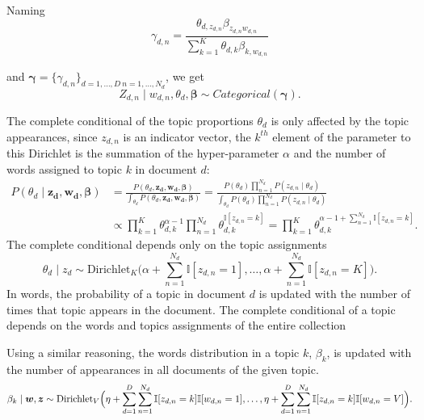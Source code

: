 Naming 
\[
  \gamma_{d,n} = \frac{\theta_{d,z_{d,n}}\beta_{z_{d,n}w_{d,n}}}{\sum_{k=1}^K \theta_{d,k}\beta_{k,w_{d,n}}}
\] 

and \(\bm{\gamma} = \{\gamma_{d,n}\}_{d=1,\dots,D \ n=1,\dots,N_{d}}\), we get
\[
  Z_{d,n} \mid w_{d,n}, \theta_{d}, \bm{\beta} \sim Categorical(\bm{\gamma}).
\]

The complete conditional of the topic proportions \(\theta_{d}\) is only affected by the topic appearances, since \(z_{d,n}\) is an indicator vector, the \(k^{th}\) element of the parameter to this Dirichlet is the summation of the hyper-parameter \(\alpha\) and the number of words assigned to topic \(k\) in document \(d\):
\[
  \begin{aligned}
    P(\theta_{d} \mid \bm{z_{d}},\bm{w_{d}}, \bm{\beta}) &= \frac{P(\theta_{d}, \bm{z_{d}}, \bm{w_{d}}, \bm{\beta})}{\int_{\theta_{d}} P(\theta_{d}, \bm{z_{d}}, \bm{w_{d}}, \bm{\beta})} = \frac{ P(\theta_{d})\prod_{n=1}^{N_{d}}P(z_{d,n}\mid \theta_{d}) }{ \int_{\theta_{d}}  P(\theta_{d})\prod_{n=1}^{N_{d}}P(z_{d,n}\mid \theta_{d})  }\\
    &\propto \prod_{k=1}^{K}\theta_{d,k}^{\alpha-1} \prod_{n=1}^{N_{d}}\theta_{d,k}^{\mathbb{I}[z_{d,n}=k]} = \prod_{k=1}^{K}\theta_{d,k}^{\alpha -1 + \sum_{n=1}^{N_{d}} \mathbb{I}[z_{d,n}=k] }.
  \end{aligned}
\]
The complete conditional depends only on the topic assignments
\[
  \theta_{d} \mid z_{d} \sim \text{Dirichlet}_{K}\Big(\alpha + \sum_{n=1}^{N_{d}} \mathbb{I}[z_{d,n}=1],\dots, \alpha + \sum_{n=1}^{N_{d}} \mathbb{I}[z_{d,n}=K]\Big).
\]
In words, the probability of a topic in document \(d\) is updated with the number of times that topic appears in the document. The complete conditional of a topic depends on the words and topics assignments of the entire collection

Using a similar reasoning, the words distribution in a topic \(k\), \(\beta_{k}\), is updated with the number of appearances in all documents of the given topic.
\[
  \beta_{k} \mid \bm{w}, \bm{z} \sim \text{Dirichlet}_{V}\Big(\eta + \sum_{d=1}^{D}\sum_{n=1}^{N_{d}}\mathbb{I}[z_{d,n} = k]\mathbb{I}[w_{d,n} = 1], \dots, \eta + \sum_{d=1}^{D}\sum_{n=1}^{N_{d}}\mathbb{I}[z_{d,n} = k]\mathbb{I}[w_{d,n} = V]\Big).
\]
